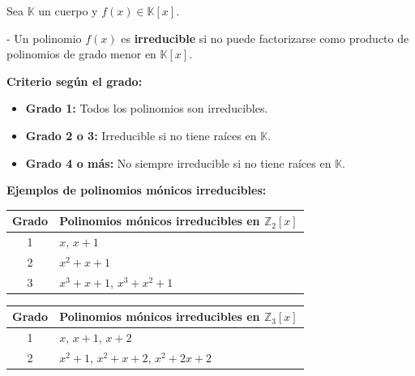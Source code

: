 \documentclass[a4paper,12pt]{article}
\begin{document}
\begin{procedimiento}[title=Polinomios irreducibles]
Sea \(\mathbb{K}\) un cuerpo y \(f(x) \in \mathbb{K}[x]\).  

- Un polinomio \(f(x)\) es \textbf{irreducible} si no puede factorizarse como producto de polinomios de grado menor en \(\mathbb{K}[x]\).  

\medskip
\textbf{Criterio según el grado:}
\begin{itemize}
  \item \textbf{Grado 1:} Todos los polinomios son irreducibles.
  \item \textbf{Grado 2 o 3:} Irreducible si no tiene raíces en \(\mathbb{K}\).
  \item \textbf{Grado 4 o más:} No siempre irreducible si no tiene raíces en \(\mathbb{K}\).
\end{itemize}

\medskip
\textbf{Ejemplos de polinomios mónicos irreducibles:}

\vspace{2mm}
\begin{tabular}{c|l}
\textbf{Grado} & \textbf{Polinomios mónicos irreducibles en \(\mathbb{Z}_2[x]\)} \\
\hline
1 & $x$, $x+1$ \\
2 & $x^2+x+1$ \\
3 & $x^3+x+1$, $x^3+x^2+1$
\end{tabular}

\vspace{2mm}

\begin{tabular}{c|l}
\textbf{Grado} & \textbf{Polinomios mónicos irreducibles en \(\mathbb{Z}_3[x]\)} \\
\hline
1 & $x$, $x+1$, $x+2$ \\
2 & $x^2+1$, $x^2+x+2$, $x^2+2x+2$ \\
\end{tabular}
\end{procedimiento}
\end{document}
